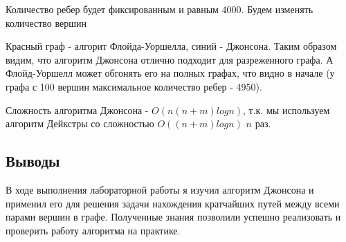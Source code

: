\documentclass[12pt]{article}
\begin{document}
Количество ребер будет фиксированным и равным 4000. Будем изменять количество вершин


Красный граф - алгорит Флойда-Уоршелла, синий - Джонсона.
Таким образом видим, что алгоритм Джонсона отлично подходит для разреженного графа. А Флойд-Уоршелл может обгонять его на полных графах, что видно в начале (у графа с 100 вершин максимальное количество ребер - 4950).

Сложность алгоритма Джонсона - $O(n(n+m)logn)$, т.к. мы используем алгоритм Дейкстры со сложностью $O((n+m)logn)$ $n$ раз.


\subsection*{Выводы}
В ходе выполнения лабораторной работы я изучил алгоритм Джонсона и применил его для решения задачи нахождения кратчайших путей между всеми парами вершин в графе. Полученные знания позволили успешно реализовать и проверить работу алгоритма на практике.
\end{document}

